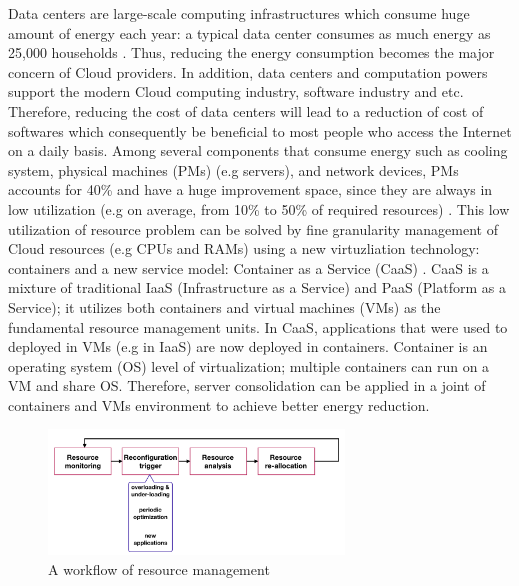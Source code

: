 
Data centers are large-scale computing infrastructures which consume huge amount of energy each year: a typical data center consumes as much energy as 25,000 households \cite{Dayarathna:2016ua}. Thus, reducing the energy consumption becomes the major concern of Cloud providers. 
In addition, data centers and computation powers support the modern Cloud computing industry, software industry and etc. Therefore, reducing the cost of data centers will lead to a reduction of cost of softwares which consequently be beneficial to most people who access the Internet on a daily basis.
Among several components that consume energy such as cooling system, physical machines (PMs) (e.g servers), and network devices, PMs accounts for 40\% and have a huge improvement space, since they are always in low utilization (e.g on average, from 10\% to 50\% of required resources) \cite{Barroso:2007jt,Shen:2015hm}. This low utilization of resource problem can be solved by fine granularity management of Cloud resources (e.g CPUs and RAMs) using a new virtuzliation technology: containers \cite{Felter:2015ki, He:2012im, Soltesz:2007cu} and a new service model: Container as a Service (CaaS) \cite{Piraghaj:2015uf}. CaaS is a mixture of traditional IaaS (Infrastructure as a Service) \cite{Mell:2011jj} and PaaS (Platform as a Service); it utilizes both containers and virtual machines (VMs) as the fundamental resource management units.
In CaaS, applications that were used to deployed in VMs (e.g in IaaS) are now deployed in containers. Container is an operating system (OS) level of virtualization; multiple containers can run on a VM and share OS. Therefore, server consolidation \cite{Varasteh:2015fu} can be applied in a joint of containers and VMs environment to achieve better energy reduction.



\begin{figure}
	\centering
	\includegraphics[width=0.7\textwidth]{pics/workflow_management.png}
	\caption{A workflow of resource management \cite{Mishra:2012kx}}
	\label{fig:workflow}
\end{figure}

